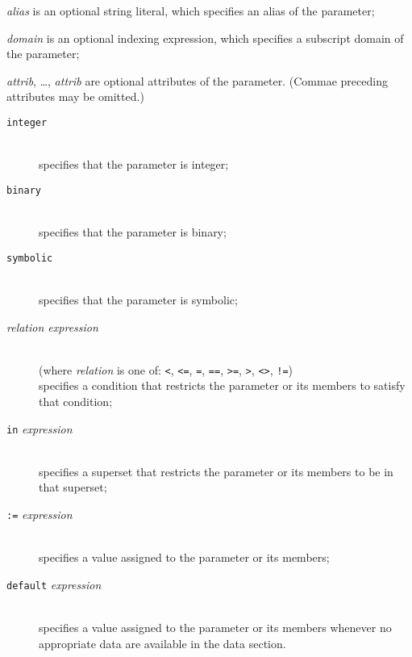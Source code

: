 \documentclass[11pt]{report}
\def\para#1{\noindent{\bf#1}}
\begin{document}
\noindent
{\it alias} is an optional string literal, which specifies an alias of
the parameter;

\noindent
{\it domain} is an optional indexing expression, which specifies
a subscript domain of the parameter;

\noindent
{\it attrib}, \dots, {\it attrib} are optional attributes of the
parameter. (Commae preceding attributes may be omitted.)

\para{Optional attributes}

\vspace*{-8pt}

\begin{description}
\item[{\tt integer}]\hspace*{0pt}\\
specifies that the parameter is integer;
\item[{\tt binary}]\hspace*{0pt}\\
specifies that the parameter is binary;
\item[{\tt symbolic}]\hspace*{0pt}\\
specifies that the parameter is symbolic;
\item[{\it relation expression}]\hspace*{0pt}\\
(where {\it relation} is one of: {\tt<}, {\tt<=}, {\tt=}, {\tt==},
{\tt>=}, {\tt>}, {\tt<>}, {\tt!=})\\
specifies a condition that restricts the parameter or its members to
satisfy that condition;
\item[{\tt in} {\it expression}]\hspace*{0pt}\\
specifies a superset that restricts the parameter or its members to be
in that superset;
\item[{\tt:=} {\it expression}]\hspace*{0pt}\\
specifies a value assigned to the parameter or its members;
\item[{\tt default} {\it expression}]\hspace*{0pt}\\
specifies a value assigned to the parameter or its members whenever
no appropriate data are available in the data section.
\end{description}

\vspace*{-8pt}
\end{document}
